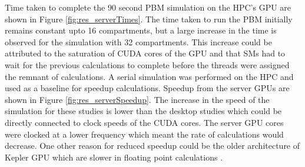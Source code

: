 \documentclass[preprint,10pt,authoryear,review]{elsarticle}
\begin{document}
Time taken to complete the $90$ second PBM simulation on the HPC's GPU are shown in 
Figure \ref{fig:res_serverTimes}. The time taken to run the PBM initially remains 
constant upto 16 compartments, but a large increase in the time is observed for the 
simulation with 32 compartments. This increase could be attributed to the saturation 
of CUDA cores of the GPU and that SMs had to wait for the previous calculations to 
complete before the threads were assigned the remnant of calculations. A serial 
simulation was performed on the HPC and used as a baseline for speedup calculations. 
Speedup from the server GPUs are shown in Figure \ref{fig:res_serverSpeedup}. The 
increase in the speed of the simulation for these studies is lower than the desktop 
studies which could be directly connected to clock speeds of the CUDA cores. The 
server GPU cores were clocked at a lower frequency which meant the rate of calculations 
would decrease. One other reason for reduced speedup could be the older architecture 
of Kepler GPU which are slower in floating point calculations \citep{Pascal2016}.
\end{document}
